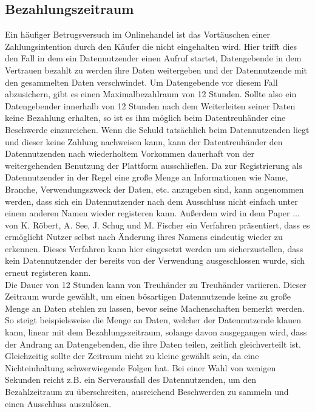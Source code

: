\documentclass{scrreprt}
\begin{document}
\subsection{Bezahlungszeitraum}
\label{subsec:paymentTimespan}
Ein häufiger Betrugsversuch im Onlinehandel ist das Vortäuschen einer Zahlungsintention durch den Käufer die nicht eingehalten wird. Hier trifft dies den Fall in dem ein Datennutzender einen Aufruf startet, Datengebende in dem Vertrauen bezahlt zu werden ihre Daten weitergeben und der Datennutzende mit den gesammelten Daten verschwindet. Um Datengebende vor diesem Fall abzusichern, gibt es einen Maximalbezahlraum von 12 Stunden. Sollte also ein Datengebender innerhalb von 12 Stunden nach dem Weiterleiten seiner Daten keine Bezahlung erhalten, so ist es ihm möglich beim Datentreuhänder eine Beschwerde einzureichen. Wenn die Schuld tatsächlich beim Datennutzenden liegt und dieser keine Zahlung nachweisen kann, kann der Datentreuhänder den Datennutzenden nach wiederholtem Vorkommen dauerhaft von der weitergehenden Benutzung der Plattform ausschließen. Da zur Registrierung als Datennutzender in der Regel eine große Menge an Informationen wie Name, Branche, Verwendungszweck der Daten, etc. anzugeben sind, kann angenommen werden, dass sich ein Datennutzender nach dem Ausschluss nicht einfach unter einem anderen Namen wieder registeren kann. Außerdem wird in dem Paper ... von K. Röbert, A. See, J. Schug und M. Fischer ein Verfahren präsentiert, dass es ermöglicht Nutzer selbst nach Änderung ihres Namens eindeutig wieder zu erkennen. Dieses Verfahren kann hier eingesetzt werden um sicherzustellen, dass kein Datennutzender der bereits von der Verwendung ausgeschlossen wurde, sich erneut registeren kann.\\

Die Dauer von 12 Stunden kann von Treuhänder zu Treuhänder variieren. Dieser Zeitraum wurde gewählt, um einen bösartigen Datennutzende keine zu große Menge an Daten stehlen zu lassen, bevor seine Machenschaften bemerkt werden. So steigt beispielsweise die Menge an Daten, welcher der Datennutzende klauen kann, linear mit dem Bezahlungszeitraum, solange davon ausgegangen wird, dass der Andrang an Datengebenden, die ihre Daten teilen, zeitlich gleichverteilt ist. Gleichzeitig sollte der Zeitraum nicht zu kleine gewählt sein, da eine Nichteinhaltung schwerwiegende Folgen hat. Bei einer Wahl von wenigen Sekunden reicht z.B. ein Serverausfall des Datennutzenden, um den Bezahlzeitraum zu überschreiten, ausreichend Beschwerden zu sammeln und einen Ausschluss auszulösen.
\end{document}
